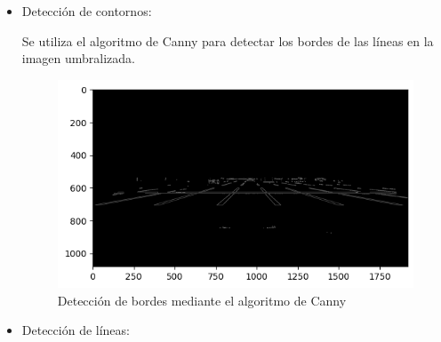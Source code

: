 \begin{itemize}
    \clearpage
    \item Detección de contornos:

    Se utiliza el algoritmo de Canny para detectar los bordes de las líneas en la imagen umbralizada.
    \begin{figure}[!ht]
        \centering
        \includegraphics[width=0.6  \textwidth]{img/reticule/canny}
        \caption{Detección de bordes mediante el algoritmo de Canny}
        \label{fig:edges}
    \end{figure}

    \item Detección de líneas:


\end{itemize}
